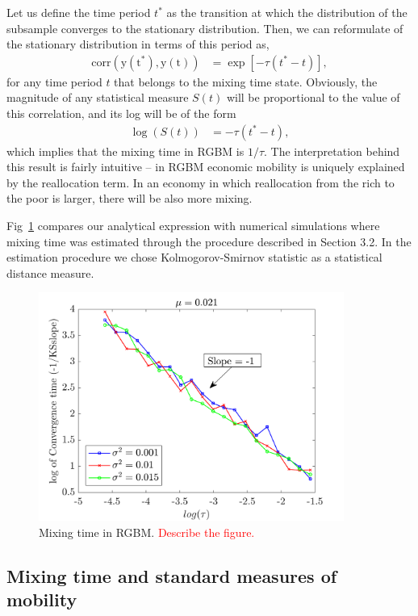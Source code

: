 \documentclass[11pt]{article}
\numberwithin{equation}{section}
\begin{document}
Let us define the time period $t^*$ as the transition at which the distribution of the subsample converges to the stationary distribution. Then, we can reformulate of the stationary distribution in terms of this period as,
\begin{align*}
    \mathrm{corr(y(t^*), y(t))} &= \exp\left[ -\tau (t^* -t)\right],
\end{align*}
for any time period $t$ that belongs to the mixing time state. Obviously, the magnitude of any statistical measure $S(t)$ will be proportional to the value of this correlation, and its log will be of the form
\begin{align}
    \log (S(t)) &=  - \tau (t^*-t),
\end{align}
which implies that the mixing time in RGBM is $1/\tau$. The interpretation behind this result is fairly intuitive -- in RGBM economic mobility is uniquely explained by the reallocation term. In an economy in which reallocation from the rich to the poor is larger, there will be also more mixing. 

Fig~\ref{fig:rgbm-mixing-time} compares our analytical expression with numerical simulations where mixing time was estimated through the procedure described in Section 3.2. In the estimation procedure we chose Kolmogorov-Smirnov statistic as a statistical distance measure.
\begin{figure}[t!]
\includegraphics[width=10cm]{figs/fig_mixing_time_rgbm.png}
\caption{Mixing time in RGBM. \textcolor{red}{Describe the figure.}\label{fig:rgbm-mixing-time}}
\end{figure}



\subsection{Mixing time and standard measures of mobility}\label{sec:measures}
\end{document}
